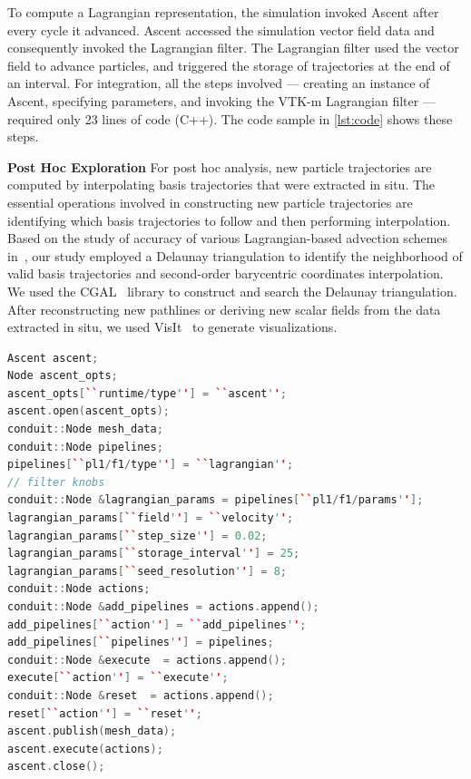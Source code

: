 To compute a Lagrangian representation, the simulation invoked Ascent after every cycle it advanced.
%
Ascent accessed the simulation vector field data and consequently invoked the Lagrangian filter. 
%
The Lagrangian filter used the vector field to advance particles, and triggered the storage of trajectories at the end of an interval.
%
%
For integration, all the steps involved --- creating an instance of Ascent, specifying parameters, and invoking the VTK-m Lagrangian filter --- required only 23 lines of code (C++). %
%
The code sample in \ref{lst:code} shows these steps. 
%

\noindent\textbf{Post Hoc Exploration}
For post hoc analysis, new particle trajectories are computed by interpolating basis trajectories that were extracted in situ.
%
The essential operations involved in constructing new particle trajectories are identifying which basis trajectories to follow and then performing interpolation.
%
Based on the study of accuracy of various Lagrangian-based advection schemes in~\cite{agranovsky2015subsampling}, our study employed a Delaunay triangulation to identify the neighborhood of valid basis trajectories and second-order barycentric coordinates interpolation.
%
We used the CGAL~\cite{fabri2011cgal} library to construct and search the Delaunay triangulation.
%
After reconstructing new pathlines or deriving new scalar fields from the data extracted in situ, we used VisIt~\cite{childs2012visit} to generate visualizations.

\begin{lstlisting}[basicstyle=\footnotesize, label={lst:code}, caption=Ascent example., language=C++] 
Ascent ascent;
Node ascent_opts;
ascent_opts[``runtime/type''] = ``ascent'';
ascent.open(ascent_opts);
conduit::Node mesh_data;
conduit::Node pipelines;
pipelines[``pl1/f1/type''] = ``lagrangian'';
// filter knobs
conduit::Node &lagrangian_params = pipelines[``pl1/f1/params''];
lagrangian_params[``field''] = ``velocity'';
lagrangian_params[``step_size''] = 0.02; 
lagrangian_params[``storage_interval''] = 25; 
lagrangian_params[``seed_resolution''] = 8; 
conduit::Node actions;
conduit::Node &add_pipelines = actions.append();
add_pipelines[``action''] = ``add_pipelines'';
add_pipelines[``pipelines''] = pipelines;
conduit::Node &execute  = actions.append();
execute[``action''] = ``execute'';
conduit::Node &reset  = actions.append();
reset[``action''] = ``reset'';
ascent.publish(mesh_data);
ascent.execute(actions);
ascent.close();
\end{lstlisting}
%
%
%
%

